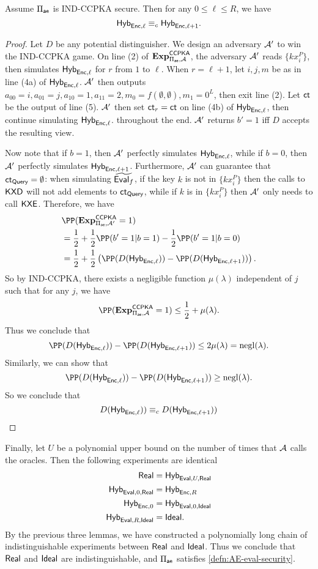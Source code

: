 \begin{lemma}
    Assume $\Pi_{\mathsf{ae}}$ is IND-CCPKA secure. Then for any $0 \leq \ell \leq R$, we have
    $$\mathsf{Hyb}_{\mathsf{Enc}, \ell} \equiv_c \mathsf{Hyb}_{\mathsf{Enc}, \ell + 1}.$$
\end{lemma}
\begin{proof}
    Let $D$ be any potential distinguisher. We design an adversary $\mathcal{A}'$ to win the IND-CCPKA game. On line (2) of $\mathbf{Exp}^{\mathsf{CCPKA}}_{\Pi_{\mathsf{ae}}, \mathcal{A}}$, the adversary $\mathcal{A}'$ reads $\{kx_i^P\}$, then simulates $\mathsf{Hyb}_{\mathsf{Enc}, \ell}$ for $r$ from $1$ to $\ell$. When $r = \ell + 1$, let $i, j, m$ be as in line (4a) of $\mathsf{Hyb}_{\mathsf{Enc}, \ell}$. $\mathcal{A}'$ then outputs $a_{00} = i, a_{01} = j, a_{10} = 1, a_{11} = 2, m_0 = f(\emptyset, \emptyset), m_1 = 0^L$, then exit line (2). Let $\mathsf{ct}$ be the output of line (5). $\mathcal{A}'$ then set $\mathsf{ct}_r = \mathsf{ct}$ on line (4b) of $\mathsf{Hyb}_{\mathsf{Enc}, \ell}$, then continue simulating $\mathsf{Hyb}_{\mathsf{Enc}, \ell}$. throughout the end. $\mathcal{A}'$ returns $b' = 1$ iff $D$ accepts the resulting view.

     Now note that if $b = 1$, then $\mathcal{A}'$ perfectly simulates $\mathsf{Hyb}_{\mathsf{Enc}, \ell}$, while if $b = 0$, then $\mathcal{A}'$ perfectly simulates $\mathsf{Hyb}_{\mathsf{Enc}, \ell+1}$. Furthermore, $\mathcal{A}'$ can guarantee that $\mathsf{ct}_{\mathsf{Query}} = \emptyset$: when simulating $\widetilde{\mathsf{Eval}_f}$, if the key $k$ is not in $\{kx_i^P\}$ then the calls to $\mathsf{KXD}$ will not add elements to $\mathsf{ct}_{\mathsf{Query}}$, while if $k$ is in $\{kx_i^P\}$ then $\mathcal{A}'$ only needs to call $\mathsf{KXE}$. Therefore, we have
    \begin{align*}
     &\PP(\mathbf{Exp}^{\mathsf{CCPKA}}_{\Pi_{\ae}, \cA'} = 1) \\
     &= \frac{1}{2} + \frac{1}{2}\PP(b' = 1 | b = 1) - \frac{1}{2}\PP(b' = 1 | b = 0) \\   
     &= \frac{1}{2} + \frac{1}{2}\left(\PP(D(\Hyb_{\enc, \ell})) - \PP(D(\Hyb_{\enc, \ell+1}))\right).
    \end{align*}
    So by IND-CCPKA, there exists a negligible function $\mu(\lambda)$ independent of $j$ such that for any $j$, we have
    $$\PP(\mathbf{Exp}^{\mathsf{CCPKA}}_{\Pi_{\ae}, \cA} = 1) \leq \frac{1}{2} + \mu(\lambda).$$
    Thus we conclude that
    $$\PP(D(\Hyb_{\enc, \ell})) - \PP(D(\Hyb_{\enc, \ell+1})) \leq 2\mu(\lambda) = \negl(\lambda).$$
    Similarly, we can show that
    $$\PP(D(\Hyb_{\enc, \ell})) - \PP(D(\Hyb_{\enc, \ell+1})) \geq \negl(\lambda).$$
    So we conclude that
    $$D(\mathsf{Hyb}_{\mathsf{Enc}, \ell})) \equiv_c D(\mathsf{Hyb}_{\mathsf{Enc}, \ell + 1}))$$
\end{proof}
Finally, let $U$ be a polynomial upper bound on the number of times that $\mathcal{A}$ calls the oracles. Then the following experiments are identical
\begin{align*}
\mathsf{Real} &= \mathsf{Hyb}_{\mathsf{Eval}, U, \mathsf{Real}} \\
\mathsf{Hyb}_{\mathsf{Eval}, 0, \mathsf{Real}} &= \mathsf{Hyb}_{\mathsf{Enc}, R} \\
\mathsf{Hyb}_{\mathsf{Enc}, 0} &= \mathsf{Hyb}_{\mathsf{Eval}, 0, \mathsf{Ideal}} \\
\mathsf{Hyb}_{\mathsf{Eval}, R, \mathsf{Ideal}} &= \mathsf{Ideal}.
\end{align*}
By the previous three lemmas, we have constructed a polynomially long chain of indistinguishable experiments between $\mathsf{Real}$ and $\mathsf{Ideal}$. Thus we conclude that $\mathsf{Real}$ and $\mathsf{Ideal}$ are indistinguishable, and $\Pi_{\mathsf{ae}}$ satisfies \cref{defn:AE-eval-security}.